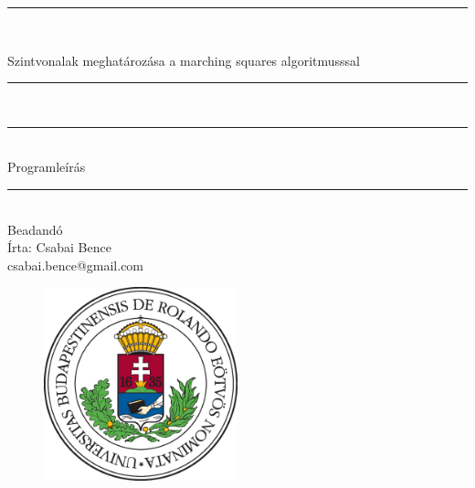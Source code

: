 \documentclass[a4paper, 12pt]{article}
\numberwithin{equation}{section}          %
\numberwithin{figure}{subsection}
\begin{document}
\begin{titlepage}   
\begin{center}
\thispagestyle{empty}  

\vspace*{0.7cm}
\rule{\linewidth}{0.5mm} \\[3mm]
\vspace*{0.7cm}

{\LARGE Szintvonalak meghatározása a marching squares algoritmusssal}

\vspace*{0.7cm}
\rule{\linewidth}{0.5mm} \\[3mm]
\rule{\linewidth}{0.5mm} \\[3mm]



{\Large Programleírás\\}

\vspace*{0.7cm}
\rule{\linewidth}{0.5mm} \\[3mm]
  {\small Beadandó} \\[3mm]
  \vspace*{1cm}
{\footnotesize Írta: Csabai Bence} \\
{\tiny csabai.bence@gmail.com}

  \vspace*{1cm}

\begin{figure}[h!]
\begin{center}
\includegraphics[width=0.5\textwidth]{img/elte}
\end{center}
\end{figure}

\end{center}
\end{titlepage}
\end{document}
